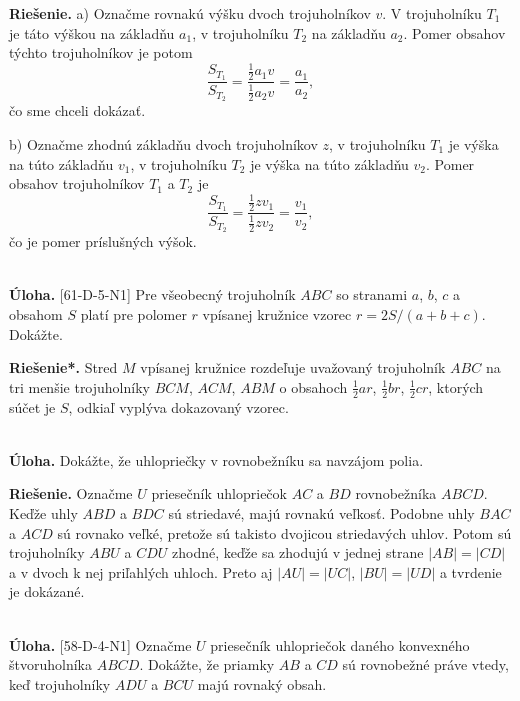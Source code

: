 \documentclass[11pt,a4paper,oneside,final]{book}
\newcommand{\ul}{\textbf{Úloha.} }
\newcommand{\rie}{\textbf{Riešenie.} }
\newcommand{\rieh}{\textbf{Riešenie*.} }
\begin{document}
\rie a) Označme rovnakú výšku dvoch trojuholníkov $v$. V trojuholníku $T_1$ je táto výškou na základňu $a_1$, v trojuholníku $T_2$ na základňu $a_2$. Pomer obsahov týchto trojuholníkov je potom $$\frac{S_{T_1}}{S_{T_2}}=\frac{\frac{1}{2}a_1v}{\frac{1}{2}a_2v}=\frac{a_1}{a_2},$$ čo sme chceli dokázať.

b) Označme zhodnú základňu dvoch trojuholníkov $z$, v trojuholníku $T_1$ je výška na túto základňu $v_1$, v trojuholníku $T_2$ je výška na túto základňu $v_2$. Pomer obsahov trojuholníkov $T_1$ a $T_2$ je
$$\frac{S_{T_1}}{S_{T_2}}=\frac{\frac{1}{2}zv_1}{\frac{1}{2}zv_2}=\frac{v_1}{v_2},$$
čo je pomer príslušných výšok.\\
\\
\begin{tcolorbox}[breakable,notitle,boxrule=0pt,colback=light-gray,colframe=light-gray]\ul [61-D-5-N1]  Pre všeobecný trojuholník $ABC$ so stranami $a$, $b$, $c$ a obsahom $S$ platí pre polomer $r$ vpísanej kružnice vzorec $r = 2S/(a + b + c)$. Dokážte.

\end{tcolorbox}

\rieh Stred $M$ vpísanej kružnice rozdeľuje uvažovaný trojuholník $ABC$ na tri menšie trojuholníky $BCM$, $ACM$, $ABM$ o obsahoch $\frac{1}{2}ar$, $\frac{1}{2}br$, $\frac{1}{2}cr$, ktorých súčet je $S$, odkiaľ vyplýva dokazovaný vzorec.\\
\\
\begin{tcolorbox}[breakable,notitle,boxrule=0pt,colback=light-gray,colframe=light-gray]\ul Dokážte, že uhlopriečky v rovnobežníku sa navzájom polia.

\end{tcolorbox}

\rie Označme $U$ priesečník uhlopriečok $AC$ a $BD$ rovnobežníka $ABCD$. Keďže uhly $ABD$ a $BDC$ sú striedavé, majú rovnakú veľkosť. Podobne uhly $BAC$ a $ACD$ sú rovnako veľké, pretože sú takisto dvojicou striedavých uhlov. Potom sú trojuholníky $ABU$ a $CDU$ zhodné, keďže sa zhodujú v jednej strane $|AB|=|CD|$ a v dvoch k nej priľahlých uhloch. Preto aj $|AU|=|UC|$, $|BU|=|UD|$ a tvrdenie je dokázané.\\
\\
\begin{tcolorbox}[breakable,notitle,boxrule=0pt,colback=light-gray,colframe=light-gray]\ul [58-D-4-N1]  Označme $U$ priesečník uhlopriečok daného konvexného štvoruholníka $ABCD$. Dokážte, že priamky $AB$ a $CD$ sú rovnobežné práve vtedy, keď trojuholníky $ADU$ a $BCU$ majú rovnaký obsah.

\end{tcolorbox}
\end{document}
